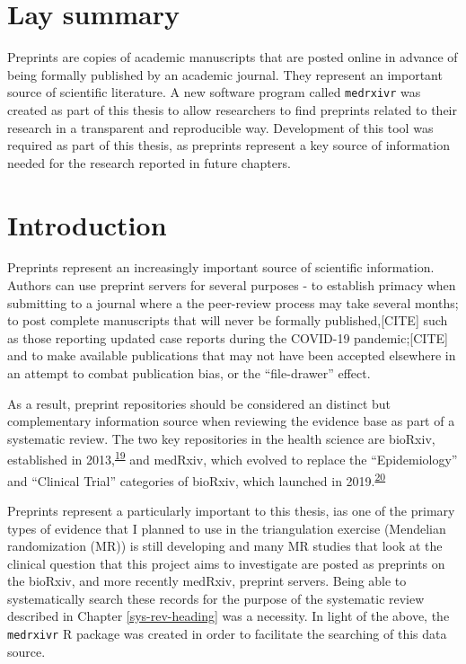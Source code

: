 \documentclass[a4paper, twoside]{templates/ociamthesis}
\begin{document}
\hypertarget{lay-summary}{%
\section{Lay summary}\label{lay-summary}}

Preprints are copies of academic manuscripts that are posted online in advance of being formally published by an academic journal.
They represent an important source of scientific literature.
A new software program called \texttt{medrxivr} was created as part of this thesis to allow researchers to find preprints related to their research in a transparent and reproducible way.
Development of this tool was required as part of this thesis, as preprints represent a key source of information needed for the research reported in future chapters.

\hypertarget{introduction}{%
\section{Introduction}\label{introduction}}

Preprints represent an increasingly important source of scientific information. Authors can use preprint servers for several purposes - to establish primacy when submitting to a journal where a the peer-review process may take several months; to post complete manuscripts that will never be formally published,{[}CITE{]} such as those reporting updated case reports during the COVID-19 pandemic;{[}CITE{]} and to make available publications that may not have been accepted elsewhere in an attempt to combat publication bias, or the ``file-drawer'' effect.

As a result, preprint repositories should be considered an distinct but complementary information source when reviewing the evidence base as part of a systematic review. The two key repositories in the health science are bioRxiv, established in 2013,\textsuperscript{\protect\hyperlink{ref-sever2019}{19}} and medRxiv, which evolved to replace the ``Epidemiology'' and ``Clinical Trial'' categories of bioRxiv, which launched in 2019.\textsuperscript{\protect\hyperlink{ref-rawlinson2019}{20}}

Preprints represent a particularly important to this thesis, ias one of the primary types of evidence that I planned to use in the triangulation exercise (Mendelian randomization (MR)) is still developing and many MR studies that look at the clinical question that this project aims to investigate are posted as preprints on the bioRxiv, and more recently medRxiv, preprint servers. Being able to systematically search these records for the purpose of the systematic review described in Chapter \ref{sys-rev-heading} was a necessity. In light of the above, the \texttt{medrxivr} R package was created in order to facilitate the searching of this data source.
\end{document}
